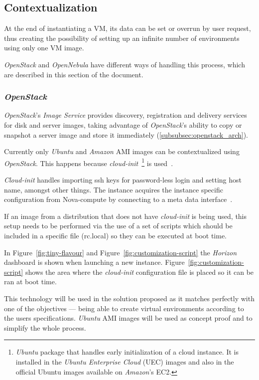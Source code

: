 \subsection{Contextualization}

At the end of instantiating a VM, its data can be set or overrun by user request, thus creating the possibility of setting up an infinite number of environments using only one VM image.

\textit{OpenStack} and \textit{OpenNebula} have different ways of handling this process, which are described in this section of the document.

\subsubsection{\textit{OpenStack}}

\textit{OpenStack}'s \textit{Image Service} provides discovery, registration and delivery services for disk and server images, taking advantage of \textit{OpenStack}'s ability to copy or snapshot a server image and store it immediately (\ref{subsubsec:openstack_arch}).

Currently only \textit{Ubuntu} and \textit{Amazon} AMI images can be contextualized using \textit{OpenStack}. This happens because \textit{cloud-init}~\footnote{\textit{Ubuntu} package that handles early initialization of a cloud instance. It is installed in the \textit{Ubuntu Enterprise Cloud} (UEC) images and also in the official Ubuntu images available on \textit{Amazon}'s EC2.} is used~\cite{essex-cloudinit}.

\textit{Cloud-init} handles importing ssh keys for password-less login and setting host name, amongst other things. The instance acquires the instance specific configuration from Nova-compute by connecting to a meta data interface~\cite{essex-cloudinit}.

If an image from a distribution that does not have \textit{cloud-init} is being used, this setup needs to be performed via the use of a set of scripts which should be included in a specific file (rc.local) so they can be executed at boot time.

In Figure~\ref{fig:tiny-flavour} and Figure~\ref{fig:customization-script} the \textit{Horizon} dashboard is shown when launching a new instance. Figure~\ref{fig:customization-script} shows the area where the \textit{cloud-init} configuration file is placed so it can be ran at boot time.

This technology will be used in the solution proposed as it matches perfectly with one of the objectives --- being able to create virtual environments according to the users specifications. \textit{Ubuntu} AMI images will be used as concept proof and to simplify the whole process.

